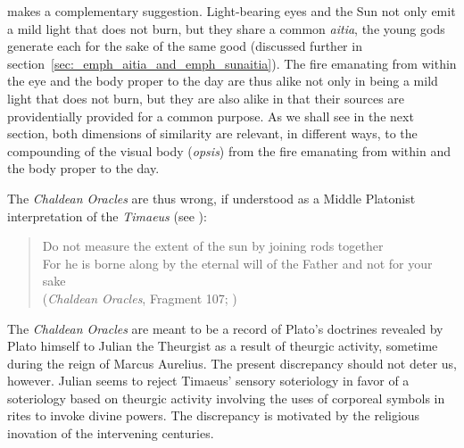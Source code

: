 \citet[112]{Johansen:2004dx} makes a complementary suggestion. Light-bearing eyes and the Sun not only emit a mild light that does not burn, but they share a common \emph{aitia}, the young gods generate each for the sake of the same good (discussed further in section~\ref{sec:_emph_aitia_and_emph_sunaitia}). The fire emanating from within the eye and the body proper to the day are thus alike not only in being a mild light that does not burn, but they are also alike in that their sources are providentially provided for a common purpose. As we shall see in the next section, both dimensions of similarity are relevant, in different ways, to the compounding of the visual body (\emph{opsis}) from the fire emanating from within and the body proper to the day.

The \emph{Chaldean Oracles} are thus wrong, if understood as a Middle Platonist interpretation of the \emph{Timaeus} (see \citealt{Brisson:2003aa}):
\begin{verse}
	Do not measure the extent of the sun by joining rods together\\
	For he is borne along by the eternal will of the Father and not for your sake\\ (\emph{Chaldean Oracles}, Fragment 107; )
\end{verse} 
The \emph{Chaldean Oracles} are meant to be a record of Plato's doctrines revealed by Plato himself to Julian the Theurgist as a result of theurgic activity, sometime during the reign of Marcus Aurelius. The present discrepancy should not deter us, however. Julian seems to reject Timaeus' sensory soteriology in favor of a soteriology based on theurgic activity involving the uses of corporeal symbols in rites to invoke divine powers. The discrepancy is motivated by the religious inovation of the intervening centuries.

